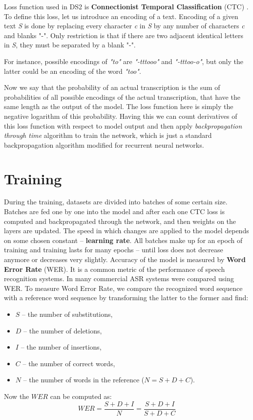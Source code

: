 \documentclass[licencjacka,en]{pracamgr}
\begin{document}
Loss function used in DS2 is \textbf{Connectionist Temporal Classification} (CTC) \cite{DS3}. To define this loss, let us introduce an encoding of a text. Encoding of a given text \textit{S} is done by replacing every character \textit{c} in \textit{S} by any number of characters \textit{c} and blanks "-". Only restriction is that if there are two adjacent identical letters in \textit{S}, they must be separated by a blank "-".

For instance, possible encodings of \textit{"to"} are \textit{"-tttooo"} and \textit{"-tttoo-o"}, but only the latter could be an encoding of the word \textit{"too"}.

Now we say that the probability of an actual transcription is the sum of probabilities of all possible encodings of the actual transcription, that have the same length as the output of the model. The loss function here is simply the negative logarithm of this probability. Having this we can count derivatives of this loss function with respect to model output and then apply \textit{backpropagation through time} algorithm to train the network, which is just a standard backpropagation algorithm modified for recurrent neural networks.

\section{Training} \label{sec:trainig}
During the training, datasets are divided into batches of some certain size. Batches are fed one by one into the model and after each one CTC loss is computed and backpropagated through the network, and then weights on the layers are updated. The speed in which changes are applied to the model depends on some chosen constant -- \textbf{learning rate}. All batches make up for an epoch of training and training lasts for many epochs -- until loss does not decrease anymore or decreases very slightly.
Accuracy of the model is measured by \textbf{Word Error Rate} (WER). It is a common metric of the performance of speech recognition systems. In \cite{DS8} many commercial ASR systems were compared using WER. To measure Word Error Rate, we compare the recognized word sequence with a reference word sequence by transforming the latter to the former and find:

\begin{itemize}
  \item $S$ -- the number of substitutions,
  \item $D$ -- the number of deletions,
  \item $I$ -- the number of insertions,
  \item $C$ -- the number of correct words,
  \item $N$ -- the number of words in the reference ($N=S+D+C$).
\end{itemize}
Now the $WER$ can be computed as:
$$
WER = \frac{S + D + I}{N} = \frac{S + D + I}{S + D + C}
$$
\end{document}
